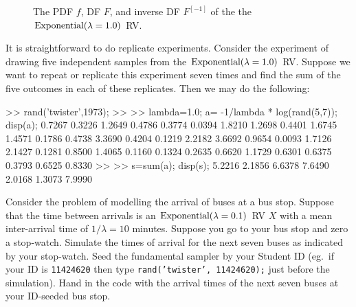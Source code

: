 \begin{figure}[htpb]
\caption{The PDF $f$, DF $F$, and inverse DF $F^{[-1]}$ of the the $\mbox{{\rm Exponential}}(\lambda=1.0)$ RV. \label{F:ExpfFFInv}}
\centering   {}
\end{figure}

It is straightforward to do replicate experiments.  Consider the experiment of drawing five  independent samples from the $\mbox{{\rm Exponential}}(\lambda=1.0)$ RV.  Suppose we want to repeat or replicate this experiment seven times and find the sum of the five outcomes in each of these replicates.  Then we may do the following:

\begin{VrbM}
>> rand('twister',1973); %
>> %
>> lambda=1.0; a= -1/lambda * log(rand(5,7)); disp(a);
    0.7267    0.3226    1.2649    0.4786    0.3774    0.0394    1.8210
    1.2698    0.4401    1.6745    1.4571    0.1786    0.4738    3.3690
    0.4204    0.1219    2.2182    3.6692    0.9654    0.0093    1.7126
    2.1427    0.1281    0.8500    1.4065    0.1160    0.1324    0.2635
    0.6620    1.1729    0.6301    0.6375    0.3793    0.6525    0.8330
>> %
>> s=sum(a); disp(s);
    5.2216    2.1856    6.6378    7.6490    2.0168    1.3073    7.9990
\end{VrbM}

\begin{labwork}\label{LW:Next7Buses}
Consider the problem of modelling the arrival of buses at a bus stop.  Suppose that the time between arrivals is an $\mbox{{\rm Exponential}}(\lambda=0.1)$ RV $X$ with a mean inter-arrival time of $1/\lambda=10$ minutes.  Suppose you go to your bus stop and zero a stop-watch.  Simulate the times of arrival for the next seven buses as indicated by your stop-watch.  Seed the fundamental sampler by your Student ID (eg.~if your ID is {\tt 11424620} then type {\tt rand('twister', 11424620);} just before the simulation).  Hand in the code with the arrival times of the next seven buses at your ID-seeded bus stop.
\end{labwork}

